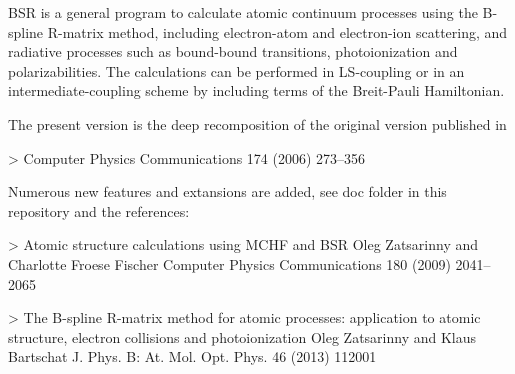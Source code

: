 B\+SR is a general program to calculate atomic continuum processes using the B-\/spline R-\/matrix method, including electron-\/atom and electron-\/ion scattering, and radiative processes such as bound-\/bound transitions, photoionization and polarizabilities. The calculations can be performed in L\+S-\/coupling or in an intermediate-\/coupling scheme by including terms of the Breit-\/\+Pauli Hamiltonian.

The present version is the deep recomposition of the original version published in \begin{DoxyVerb}  >  Computer Physics Communications 174 (2006) 273–356 
\end{DoxyVerb}


Numerous new features and extansions are added, see doc folder in this repository and the references\+: \begin{DoxyVerb}  >  Atomic structure calculations using MCHF and BSR
     Oleg Zatsarinny and Charlotte Froese Fischer  
     Computer Physics Communications 180 (2009) 2041–2065  

  >  The B-spline R-matrix method for atomic processes: 
     application to atomic structure, electron collisions and photoionization
     Oleg Zatsarinny and Klaus Bartschat  
     J. Phys. B: At. Mol. Opt. Phys. 46 (2013) 112001
\end{DoxyVerb}


 